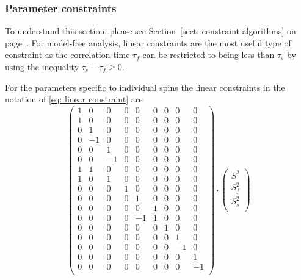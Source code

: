 \subsubsection{Parameter constraints}

To understand this section, please see Section~\ref{sect: constraint algorithms} on page~\pageref{sect: constraint algorithms}.
For model-free analysis, linear constraints are the most useful type of constraint as the correlation time $\tau_f$ can be restricted to being less than $\tau_s$ by using the inequality $\tau_s - \tau_f \geqslant 0$.

For the parameters specific to individual spins the linear constraints in the notation of \eqref{eq: linear constraint} are
\begin{equation}
    \begin{pmatrix}
        1 & 0 & 0 & 0 & 0 & 0 & 0 & 0 & 0 \\
        1 & 0 & 0 & 0 & 0 & 0 & 0 & 0 & 0 \\
        0 & 1 & 0 & 0 & 0 & 0 & 0 & 0 & 0 \\
        0 &-1 & 0 & 0 & 0 & 0 & 0 & 0 & 0 \\
        0 & 0 & 1 & 0 & 0 & 0 & 0 & 0 & 0 \\
        0 & 0 &-1 & 0 & 0 & 0 & 0 & 0 & 0 \\
        1 & 1 & 0 & 0 & 0 & 0 & 0 & 0 & 0 \\
        1 & 0 & 1 & 0 & 0 & 0 & 0 & 0 & 0 \\
        0 & 0 & 0 & 1 & 0 & 0 & 0 & 0 & 0 \\
        0 & 0 & 0 & 0 & 1 & 0 & 0 & 0 & 0 \\
        0 & 0 & 0 & 0 & 0 & 1 & 0 & 0 & 0 \\
        0 & 0 & 0 & 0 &-1 & 1 & 0 & 0 & 0 \\
        0 & 0 & 0 & 0 & 0 & 0 & 1 & 0 & 0 \\
        0 & 0 & 0 & 0 & 0 & 0 & 0 & 1 & 0 \\
        0 & 0 & 0 & 0 & 0 & 0 & 0 &-1 & 0 \\
        0 & 0 & 0 & 0 & 0 & 0 & 0 & 0 & 1 \\
        0 & 0 & 0 & 0 & 0 & 0 & 0 & 0 &-1 \\
    \end{pmatrix}
    \cdot
    \begin{pmatrix}
        S^2 \\
        S^2_f \\
        S^2_s \\

\end{pmatrix}
\end{equation}
